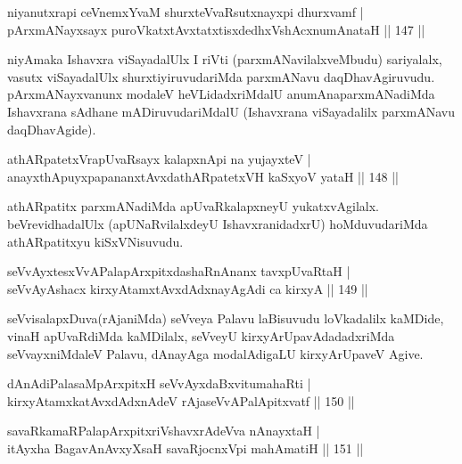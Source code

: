 \begin{shl}
niyanutxrapi ceVnemxYvaM shurxteVvaRsutxnayxpi dhurxvamf |\\
pArxmANayxsayx puroVkatxtAvxtatxtisxdedhxVshAcxnumAnataH \hfill || 147 ||
\end{shl}

\begin{artha}%
niyAmaka Ishavxra viSayadalUlx I riVti (parxmANavilalxveMbudu) sariyalalx, vasutx viSayadalUlx shurxtiyiruvudariMda parxmANavu daqDhavAgiruvudu. pArxmANayxvanunx modaleV heVLidadxriMdalU anumAnaparxmANadiMda Ishavxrana sAdhane mADi\-ruvudariMdalU (Ishavxrana viSayadalilx parxmANavu daqDhavAgide).
\end{artha}

\begin{shl}
athARpatetxVrapUvaRsayx kalapxnA\s pi na yujayxteV |\\
anayxthA\s puyxpapananxtAvxdathARpatetxVH kaSxyoV yataH \hfill || 148 ||
\end{shl}

\begin{artha}
athARpatitx parxmANadiMda apUvaRkalapxneyU yukatxvAgilalx. beVrevidhadalUlx (apUNaRvilalxdeyU IshavxranidadxrU) hoMduvudariMda athARpatitxyu kiSxVNi\-suvudu.
\end{artha}

\begin{shl}
seVvAyxtesxVvAPalapArxpitxdashaRnAnanx tavxpUvaRtaH |\\
seVvAyAshacx kirxyAtamxtAvxdAdxnayAgAdi ca kirxyA \hfill || 149 ||
\end{shl}

\begin{artha}
seVvisalapxDuva(rAjaniMda) seVveya Palavu laBisuvudu loVkadalilx kaMDide, vinaH apUvaRdiMda kaMDilalx, seVveyU kirxyArUpavAdadadxriMda seVvayxniMdaleV Palavu, dAnayAga modalAdigaLU kirxyArUpaveV Agive.
\end{artha}


\begin{shl}
dAnAdiPalasaMpArxpitxH seVvAyxdaBxvitumahaRti |\\
kirxyAtamxkatAvxdAdxnAdeV rAjaseVvAPalApitxvatf \hfill || 150 ||
\end{shl}

\begin{shl}
savaRkamaRPalapArxpitxriVshavxrAdeVva nAnayxtaH |\\
itAyxha BagavAnAvxyXsaH savaRjocnxV\s pi mahAmatiH \hfill || 151 ||
\end{shl}

